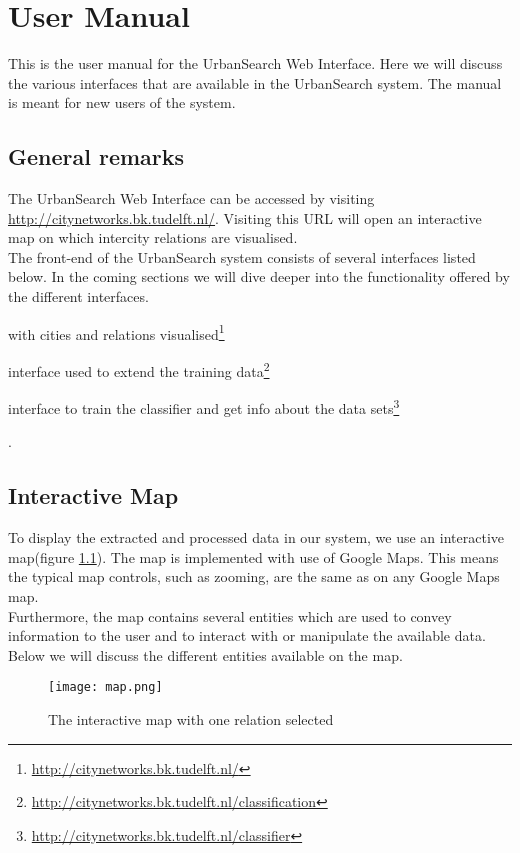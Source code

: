 \chapter{User Manual}
This is the user manual for the UrbanSearch Web Interface. Here we will discuss the various interfaces that are available in the UrbanSearch system. The manual is meant for new users of the system.

\section{General remarks}
The UrbanSearch Web Interface can be accessed by visiting \url{http://citynetworks.bk.tudelft.nl/}. Visiting this URL will open an interactive map on which intercity relations are visualised.\\
The front-end of the UrbanSearch system consists of several interfaces listed below. In the coming sections we will dive deeper into the functionality offered by the different interfaces.

\begin{description}[align=left]
\item [Interactive Map] with cities and relations visualised\footnote{\url{http://citynetworks.bk.tudelft.nl/}}
\item [Classification] interface used to extend the training data\footnote{\url{http://citynetworks.bk.tudelft.nl/classification}}
\item [Classifier] interface to train the classifier and get info about the data sets\footnote{\url{http://citynetworks.bk.tudelft.nl/classifier}}
\end{description}. 


\section{Interactive Map}

To display the extracted and processed data in our system, we use an interactive map(figure \ref{fig:map}). The map is implemented with use of Google Maps. This means the typical map controls, such as zooming, are the same as on any Google Maps map.\\
Furthermore, the map contains several entities which are used to convey information to the user and to interact with or manipulate the available data.\\
Below we will discuss the different entities available on the map.
\begin{figure}[H]
    \centering
    \texttt{[image: map.png]}
    \caption{The interactive map with one relation selected}
    \label{fig:map}
\end{figure}

